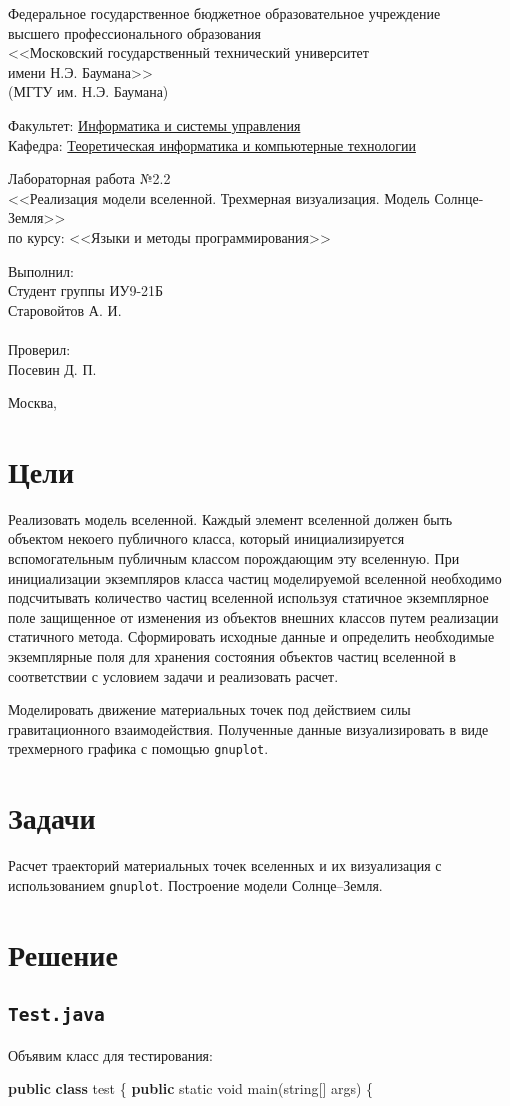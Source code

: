 \documentclass[
  12pt,
  a4paper,
]{article}
\newenvironment{Shaded}{}{}
\newcommand{\DataTypeTok}[1]{\textcolor[rgb]{0.56,0.13,0.00}{#1}}
\newcommand{\FunctionTok}[1]{\textcolor[rgb]{0.02,0.16,0.49}{#1}}
\newcommand{\KeywordTok}[1]{\textcolor[rgb]{0.00,0.44,0.13}{\textbf{#1}}}
\newcommand{\NormalTok}[1]{#1}
\newcommand{\OperatorTok}[1]{\textcolor[rgb]{0.40,0.40,0.40}{#1}}
\newcommand{\thetitle}{Реализация модели вселенной. Трехмерная визуализация.
Модель Солнце-Земля}
\newcommand{\theauthor}{Старовойтов А. И.}
\newcommand{\theteacher}{Посевин Д. П.}
\newcommand{\thegroup}{ИУ9-21Б}
\newcommand{\thecourse}{Языки и методы программирования}
\newcommand{\thenumber}{2.2}
\renewcommand{\maketitle}
{
\newgeometry{
  left=0.7in,
  right=0.7in,
}
\begin{titlepage}
    \centering
    Федеральное государственное бюджетное образовательное учреждение\\
    высшего профессионального образования\\
    <<Московский государственный технический университет\\
    имени Н.Э. Баумана>>\\
    (МГТУ им. Н.Э. Баумана)
    \vspace{1cm}

    \flushleft

    Факультет: \underline{Информатика и системы управления}\\
    Кафедра: \underline{Теоретическая информатика и компьютерные технологии}

    \centering
    \topskip0pt
    \vspace*{\fill}
    Лабораторная работа №\thenumber{}\\
    <<\thetitle{}>>\\
    по курсу: <<\thecourse{}>>
    \vspace*{\fill}
    \centering


    \hfill\begin{minipage}{0.4\linewidth}
        Выполнил:\\
        Студент группы \thegroup{}\\
        \theauthor\\
        \\
        Проверил:\\
        \theteacher
    \end{minipage}

    \vfill

    Москва, \the\year{}

\end{titlepage}
\restoregeometry{}
}
\begin{document}
\maketitle

\hypertarget{ux446ux435ux43bux438}{%
\section{Цели}\label{ux446ux435ux43bux438}}

Реализовать модель вселенной. Каждый элемент вселенной должен быть
объектом некоего публичного класса, который инициализируется
вспомогательным публичным классом порождающим эту вселенную. При
инициализации экземпляров класса частиц моделируемой вселенной
необходимо подсчитывать количество частиц вселенной используя статичное
экземплярное поле защищенное от изменения из объектов внешних классов
путем реализации статичного метода. Сформировать исходные данные и
определить необходимые экземплярные поля для хранения состояния объектов
частиц вселенной в соответствии с условием задачи и реализовать расчет.

Моделировать движение материальных точек под действием силы
гравитационного взаимодействия. Полученные данные визуализировать в виде
трехмерного графика с помощью \texttt{gnuplot}.

\hypertarget{ux437ux430ux434ux430ux447ux438}{%
\section{Задачи}\label{ux437ux430ux434ux430ux447ux438}}

Расчет траекторий материальных точек вселенных и их визуализация с
использованием \texttt{gnuplot}. Построение модели Солнце--Земля.

\hypertarget{ux440ux435ux448ux435ux43dux438ux435}{%
\section{Решение}\label{ux440ux435ux448ux435ux43dux438ux435}}

\hypertarget{test.java}{%
\subsection{\texorpdfstring{\texttt{Test.java}}{Test.java}}\label{test.java}}

Объявим класс для тестирования:

\begin{Shaded}
\begin{Highlighting}[]
\KeywordTok{public} \KeywordTok{class}\NormalTok{ test }\OperatorTok{\{}
    \KeywordTok{public} \DataTypeTok{static} \DataTypeTok{void} \FunctionTok{main}\OperatorTok{(}\NormalTok{string}\OperatorTok{[]}\NormalTok{ args}\OperatorTok{)} \OperatorTok{\{}
\end{Highlighting}
\end{Shaded}
\end{document}
